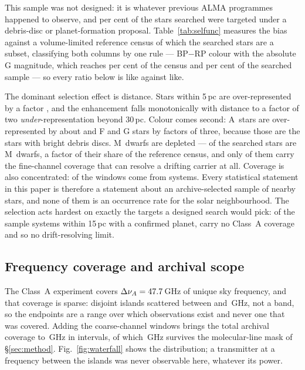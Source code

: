 This sample was not designed: it is whatever previous ALMA programmes
happened to observe, and \PctDiscProposal{} per cent of the stars searched
were targeted under a debris-disc or planet-formation proposal.
Table~\ref{tab:selfunc} measures the bias against a volume-limited reference
census of which the searched stars are a subset, classifying both columns by
one rule --- BP$-$RP colour with the absolute G magnitude, which reaches
\SfCensusColPct{} per cent of the census and \SfClassifiedPct{} per cent of
the searched sample --- so every ratio below is like against like.

The dominant selection effect is distance. Stars within 5\,pc are
over-represented by a factor \SfTopRatio, and the enhancement falls
monotonically with distance to a factor of two \emph{under}-representation
beyond 30\,pc. Colour comes second: A~stars are over-represented by about
\SfARatio{} and F and G stars by factors of three, because those are the
stars with bright debris discs. M~dwarfs are depleted ---
\SfMSearched{} of the \SfNStar{} searched stars are M~dwarfs, a factor
\SfMRatio{} of their share of the reference census, and only
\SfMClassAStars{} of them carry the fine-channel coverage that can resolve a
drifting carrier at all. Coverage is also concentrated:
\ConcThreeWin{} of the \NWindows{} windows come from \ConcThreeSys{}
systems. Every statistical statement in this paper is therefore a statement
about an archive-selected sample of nearby stars, and none of them is an
occurrence rate for the solar neighbourhood. The selection acts hardest on
exactly the targets a designed search would pick: of the \CsIntNRow{} sample
systems within 15\,pc with a confirmed planet, \CsIntNoClassA{} carry no
Class~A coverage and so no drift-resolving limit.




\subsection{Frequency coverage and archival scope}
\label{sec:coverage}

The Class~A experiment covers $\Delta\nu_A=47.7$\,GHz of unique sky
frequency, and that coverage is sparse: \DomAIslands{} disjoint islands
scattered between \DomAFreqLo{} and \DomAFreqHi\,GHz, not a band, so the
endpoints are a range over which observations exist and never one that was
covered. Adding the coarse-channel windows brings the total archival coverage
to \DnuAB\,GHz in \UnionIntervals{} intervals, of which \SearchedUnionGHz\,GHz
survives the molecular-line mask of \S\ref{sec:method}.
Fig.~\ref{fig:waterfall} shows the distribution; a transmitter at a frequency
between the islands was never observable here, whatever its power.

